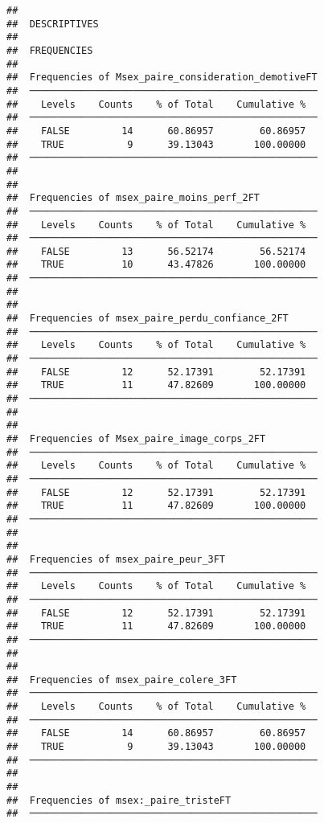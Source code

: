 \documentclass[
]{article}
\begin{document}
\begin{verbatim}
## 
##  DESCRIPTIVES
## 
##  FREQUENCIES
## 
##  Frequencies of Msex_paire_consideration_demotiveFT 
##  ────────────────────────────────────────────────── 
##    Levels    Counts    % of Total    Cumulative %   
##  ────────────────────────────────────────────────── 
##    FALSE         14      60.86957        60.86957   
##    TRUE           9      39.13043       100.00000   
##  ────────────────────────────────────────────────── 
## 
## 
##  Frequencies of msex_paire_moins_perf_2FT           
##  ────────────────────────────────────────────────── 
##    Levels    Counts    % of Total    Cumulative %   
##  ────────────────────────────────────────────────── 
##    FALSE         13      56.52174        56.52174   
##    TRUE          10      43.47826       100.00000   
##  ────────────────────────────────────────────────── 
## 
## 
##  Frequencies of msex_paire_perdu_confiance_2FT      
##  ────────────────────────────────────────────────── 
##    Levels    Counts    % of Total    Cumulative %   
##  ────────────────────────────────────────────────── 
##    FALSE         12      52.17391        52.17391   
##    TRUE          11      47.82609       100.00000   
##  ────────────────────────────────────────────────── 
## 
## 
##  Frequencies of Msex_paire_image_corps_2FT          
##  ────────────────────────────────────────────────── 
##    Levels    Counts    % of Total    Cumulative %   
##  ────────────────────────────────────────────────── 
##    FALSE         12      52.17391        52.17391   
##    TRUE          11      47.82609       100.00000   
##  ────────────────────────────────────────────────── 
## 
## 
##  Frequencies of msex_paire_peur_3FT                 
##  ────────────────────────────────────────────────── 
##    Levels    Counts    % of Total    Cumulative %   
##  ────────────────────────────────────────────────── 
##    FALSE         12      52.17391        52.17391   
##    TRUE          11      47.82609       100.00000   
##  ────────────────────────────────────────────────── 
## 
## 
##  Frequencies of msex_paire_colere_3FT               
##  ────────────────────────────────────────────────── 
##    Levels    Counts    % of Total    Cumulative %   
##  ────────────────────────────────────────────────── 
##    FALSE         14      60.86957        60.86957   
##    TRUE           9      39.13043       100.00000   
##  ────────────────────────────────────────────────── 
## 
## 
##  Frequencies of msex:_paire_tristeFT                
##  ────────────────────────────────────────────────── 

\end{verbatim}
\end{document}
